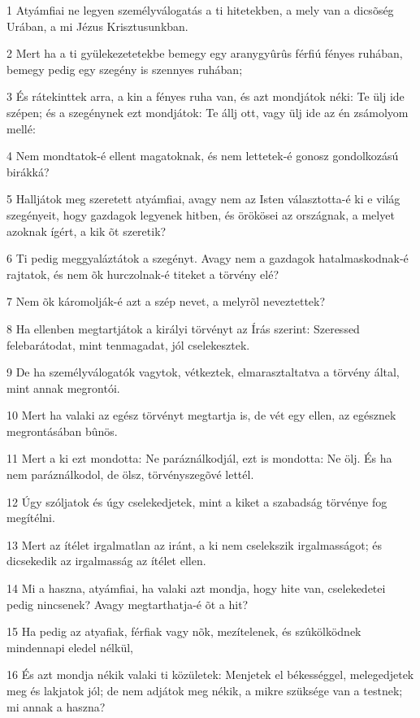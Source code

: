 \par 1 Atyámfiai ne legyen személyválogatás a ti hitetekben, a mely van a dicsõség Urában, a mi Jézus Krisztusunkban.
\par 2 Mert ha a ti gyülekezetetekbe bemegy egy aranygyûrûs férfiú fényes ruhában, bemegy pedig egy szegény is szennyes ruhában;
\par 3 És rátekinttek arra, a kin a fényes ruha van, és azt mondjátok néki: Te ülj ide szépen; és a szegénynek ezt mondjátok: Te állj ott, vagy ülj ide az én zsámolyom mellé:
\par 4 Nem mondtatok-é ellent magatoknak, és nem lettetek-é gonosz gondolkozású birákká?
\par 5 Halljátok meg szeretett atyámfiai, avagy nem az Isten választotta-é ki e világ szegényeit, hogy  gazdagok legyenek hitben, és örökösei az országnak, a melyet azoknak ígért, a kik õt szeretik?
\par 6 Ti pedig meggyaláztátok a szegényt. Avagy nem a gazdagok hatalmaskodnak-é rajtatok, és nem õk hurczolnak-é titeket a törvény elé?
\par 7 Nem õk káromolják-é azt a szép nevet, a melyrõl neveztettek?
\par 8 Ha ellenben megtartjátok a királyi törvényt az Írás szerint: Szeressed felebarátodat, mint tenmagadat, jól cselekesztek.
\par 9 De ha személyválogatók vagytok, vétkeztek, elmarasztaltatva a törvény által, mint annak megrontói.
\par 10 Mert ha valaki az egész törvényt megtartja is, de vét egy ellen, az egésznek megrontásában bûnös.
\par 11 Mert a ki ezt mondotta: Ne paráználkodjál, ezt is mondotta: Ne ölj. És ha nem paráználkodol, de ölsz, törvényszegõvé lettél.
\par 12 Úgy szóljatok és úgy cselekedjetek, mint a kiket a szabadság törvénye fog megítélni.
\par 13 Mert az ítélet irgalmatlan az iránt, a ki nem cselekszik irgalmasságot; és dicsekedik az irgalmasság az ítélet ellen.
\par 14 Mi a haszna, atyámfiai, ha valaki azt mondja, hogy hite van, cselekedetei pedig nincsenek? Avagy megtarthatja-é õt a hit?
\par 15 Ha pedig az atyafiak, férfiak vagy nõk, mezítelenek, és szûkölködnek mindennapi eledel nélkül,
\par 16 És azt mondja nékik valaki ti közületek: Menjetek el békességgel, melegedjetek meg és lakjatok jól; de nem adjátok meg nékik, a mikre szüksége van a testnek; mi annak a haszna?
